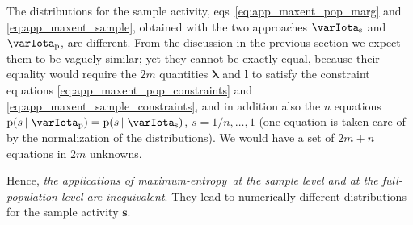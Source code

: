 \documentclass[\ifafour a4paper,12pt,\else a5paper,10pt,\fi%
onecolumn,oneside,article,%
british%
]{memoir}
\theoremstyle{remark}
\theoremstyle{innote}
\newcommand*{\pf}{\mathrm{p}}%
\renewcommand*{\|}{\nonscript\,\vert\nonscript\;\mathopen{}}
\newcommand*{\eqns}{eqs}%
\newcommand*{\yrv}{s}
\newcommand*{\yr}{\bm{\yrv}}%
\newcommand*{\yrs}{\yrv}%
\newcommand*{\yHa}{\varIota_\textrm{p}}
\newcommand*{\yHb}{\varIota_\textrm{s}}
\newcommand*{\yL}{\bm{\lambda}}
\newcommand*{\yl}{\bm{l}}
\newcommand*{\me}{maximum-entropy}
\begin{document}
The distributions for the sample activity,
\eqns~\eqref{eq:app_maxent_pop_marg} and \eqref{eq:app_maxent_sample},
obtained with the two approaches $\yHb$ and $\yHa$, are different. From the
discussion in the previous section we expect them to be vaguely similar;
yet they cannot be exactly equal, because their equality would require the
$2m$ quantities $\yL$ and $\yl$ to satisfy the constraint equations
\eqref{eq:app_maxent_pop_constraints} and
\eqref{eq:app_maxent_sample_constraints}, and in addition also the $n$
equations $\pf(\yrs \| \yHa) = \pf(\yrs \| \yHb)$,
$\yrs=1/n,\dotsc,1$ (one equation is taken care of by the normalization of
the distributions). We would have a set of $2m+n$ equations in $2m$
unknowns.

Hence, \emph{the applications of \me\ at the sample level and at the
  full-population level are inequivalent}. They lead to numerically
different distributions for the sample activity $\yr$.
\end{document}

